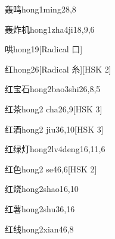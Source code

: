 \begin{entry}{轰鸣}{hong1ming2}{8,8}
\end{entry}

\begin{entry}{轰炸机}{hong1zha4ji1}{8,9,6}
\end{entry}

\begin{entry}{哄}{hong1}{9}[Radical 口]
\end{entry}

\begin{entry}{红}{hong2}{6}[Radical 糸][HSK 2]
\end{entry}

\begin{entry}{红宝石}{hong2bao3shi2}{6,8,5}
\end{entry}

\begin{entry}{红茶}{hong2 cha2}{6,9}[HSK 3]
\end{entry}

\begin{entry}{红酒}{hong2 jiu3}{6,10}[HSK 3]
\end{entry}

\begin{entry}{红绿灯}{hong2lv4deng1}{6,11,6}
\end{entry}

\begin{entry}{红色}{hong2 se4}{6,6}[HSK 2]
\end{entry}

\begin{entry}{红烧}{hong2shao1}{6,10}
\end{entry}

\begin{entry}{红薯}{hong2shu3}{6,16}
\end{entry}

\begin{entry}{红线}{hong2xian4}{6,8}
\end{entry}

